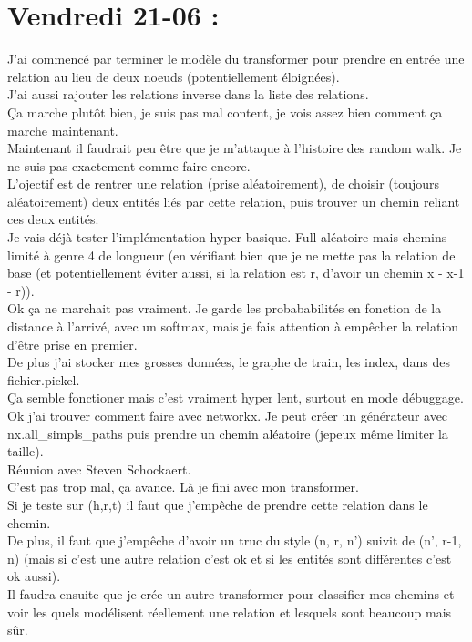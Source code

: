 \documentclass{article}
\begin{document}
\section*{Vendredi 21-06 :}
J'ai commencé par terminer le modèle du transformer pour prendre en entrée une relation au lieu de deux noeuds (potentiellement éloignées).\\
J'ai aussi rajouter les relations inverse dans la liste des relations.\\
Ça marche plutôt bien, je suis pas mal content, je vois assez bien comment ça marche maintenant.\\
Maintenant il faudrait peu être que je m'attaque à l'histoire des random walk. Je ne suis pas exactement comme faire encore.\\
L'ojectif est de rentrer une relation (prise aléatoirement), de choisir (toujours aléatoirement) deux entités liés par cette relation, puis trouver un chemin reliant ces deux entités.\\
Je vais déjà tester l'implémentation hyper basique. Full aléatoire mais chemins limité à genre 4 de longueur (en vérifiant bien que je ne mette pas la relation de base (et potentiellement éviter aussi, si la relation est r, d'avoir un chemin x - x-1 - r)).\\
Ok ça ne marchait pas vraiment. Je garde les probababilités en fonction de la distance à l'arrivé, avec un softmax, mais je fais attention à empêcher la relation d'être prise en premier.\\
De plus j'ai stocker mes grosses données, le graphe de train, les index, dans des fichier.pickel.\\
Ça semble fonctioner mais c'est vraiment hyper lent, surtout en mode débuggage.\\
Ok j'ai trouver comment faire avec networkx. Je peut créer un générateur avec nx.all\_simpls\_paths puis prendre un chemin aléatoire (jepeux même limiter la taille).\\
Réunion avec Steven Schockaert.\\
C'est pas trop mal, ça avance. Là je fini avec mon transformer.\\
Si je teste sur (h,r,t) il faut que j'empêche de prendre cette relation dans le chemin.\\
De plus, il faut que j'empêche d'avoir un truc du style (n, r, n') suivit de (n', r-1, n) (mais si c'est une autre relation c'est ok et si les entités sont différentes c'est ok aussi).\\
Il faudra ensuite que je crée un autre transformer pour classifier mes chemins et voir les quels modélisent réellement une relation et lesquels sont beaucoup mais sûr.\\
\end{document}
